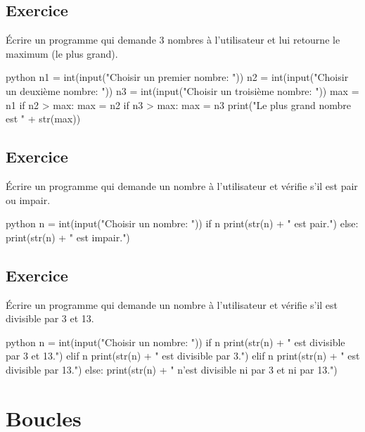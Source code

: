 \documentclass[a4paper,11pt]{article}
\begin{document}
\subsection{Exercice}
Écrire un programme qui demande 3 nombres à l'utilisateur et lui retourne le maximum (le plus grand).
\begin{solution}
\begin{code}[interactive]{python}
n1 = int(input("Choisir un premier nombre: "))
n2 = int(input("Choisir un deuxième nombre: "))
n3 = int(input("Choisir un troisième nombre: "))
max = n1
if n2 > max:
    max = n2
if n3 > max:
    max = n3
print("Le plus grand nombre est " + str(max))
\end{code}
\end{solution}

\subsection{Exercice}
Écrire un programme qui demande un nombre à l'utilisateur et vérifie s'il est pair ou impair.
\begin{solution}
\begin{code}[interactive]{python}
n = int(input("Choisir un nombre: "))
if n %
    print(str(n) + " est pair.")
else:
    print(str(n) + " est impair.")
\end{code}
\end{solution}

\subsection{Exercice}
Écrire un programme qui demande un nombre à l'utilisateur et vérifie s'il est divisible par 3 et 13.
\begin{solution}
\begin{code}[interactive]{python}
n = int(input("Choisir un nombre: "))
if n %
    print(str(n) + " est divisible par 3 et 13.")
elif n %
    print(str(n) + " est divisible par 3.")
elif n %
    print(str(n) + " est divisible par 13.")
else:
    print(str(n) + " n'est divisible ni par 3 et ni par 13.")
\end{code}
\end{solution}

\section{Boucles}
\end{document}

